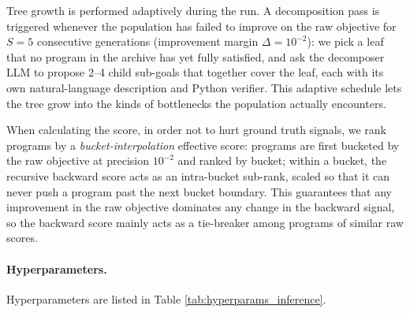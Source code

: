 \documentclass{llmxive}
\begin{document}
Tree growth is performed adaptively during the run. A decomposition pass is triggered whenever
the population has failed to improve on the raw objective for $S=5$
consecutive generations (improvement margin $\Delta=10^{-2}$): we
pick a leaf that no program in the archive has yet fully satisfied,
and ask the decomposer LLM  to
propose 2--4 child sub-goals that together cover the leaf, each with
its own natural-language description and Python verifier. This
adaptive schedule lets the tree grow into the kinds of bottlenecks the population actually encounters.

When calculating the score, in order not to hurt ground truth signals, we rank programs by a
\emph{bucket-interpolation} effective score: programs are first
bucketed by the raw objective at precision $10^{-2}$ and ranked by
bucket; within a bucket, the recursive backward score acts as an
intra-bucket sub-rank, scaled so that it can never push a program
past the next bucket boundary. This guarantees that any improvement
in the raw objective dominates any change in the backward signal, so
the backward score mainly acts as a tie-breaker among programs of similar raw scores.


\paragraph{Hyperparameters.}
Hyperparameters are listed in Table \ref{tab:hyperparams_inference}.
\end{document}
